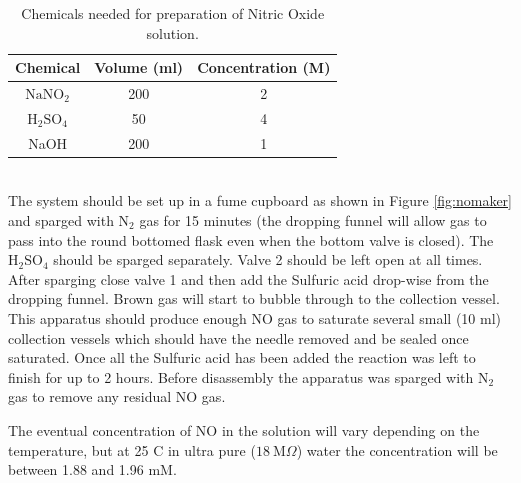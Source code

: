 \begin{table}[tbp]
\begin{center}
\begin{tabular}{ccc}
\toprule
\textbf{Chemical} & \textbf{Volume (ml)} & \textbf{Concentration (M)} \\
\midrule
$\textrm{NaNO}_2$ & 200 & 2 \\
$\textrm{H}_2\textrm{SO}_4$ & 50 & 4 \\
NaOH & 200 & 1 \\
\bottomrule
\end{tabular}
\end{center}
\caption{Chemicals needed for preparation of Nitric Oxide solution.
\label{tab:nomakerchem}}
\end{table}\\
The system should be set up in a fume cupboard as shown in Figure \ref{fig:nomaker} and sparged with $\textrm{N}_2$ gas for 15 minutes (the dropping funnel will allow gas to pass into the round bottomed flask even when the bottom valve is closed). The $\textrm{H}_2\textrm{SO}_4$ should be sparged separately. Valve 2 should be left open at all times. After sparging close valve 1 and then add the Sulfuric acid drop-wise from the dropping funnel. Brown gas will start to bubble through to the collection vessel. This apparatus should produce enough NO gas to saturate several small (10 ml) collection vessels which should have the needle removed and be sealed once saturated. Once all the Sulfuric acid has been added the reaction was left to finish for up to 2 hours. Before disassembly the apparatus was sparged with $\textrm{N}_2$ gas to remove any residual NO gas.

The eventual concentration of NO in the solution will vary depending on the temperature, but at 25 \textdegree{}C in ultra pure ($18~\mathrm{M}\Omega$) water the concentration will be between 1.88 and 1.96 mM\cite{Aga2008,Cole2008}.